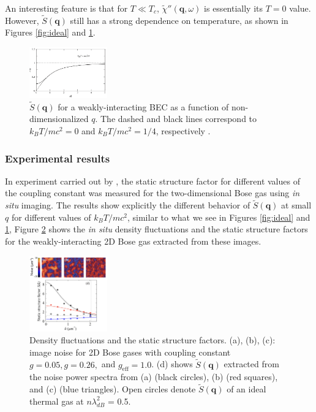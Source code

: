 \documentclass[reprint,
nofootinbib,
amsmath,amssymb,
aps]{revtex4-1}
\begin{document}
An interesting feature is that for $T \ll T_c$, $\widetilde{\chi}''(\mathbf{q},\omega)$ is essentially its $T=0$ value. However, $\widetilde{S}(\mathbf{q})$ still has a strong dependence on temperature, as shown in Figures \ref{fig:ideal} and \ref{fig:interacting}. 

\begin{figure}[!htb]
\label{fig:interacting}
\centering
\includegraphics[width=0.3\textwidth]{figures/interacting.png}
\caption{$\widetilde{S}(\mathbf{q})$ for a weakly-interacting BEC as a function of non-dimensionalized $q$. The dashed and black lines correspond to $k_BT/mc^2=0$ and $k_BT/mc^2 = 1/4$, respectively \cite{pitaevskii2016bose}.}
\end{figure}
\subsubsection{Experimental results}

In experiment carried out by \cite{hung2011extracting}, the static structure factor for different values of the coupling constant was measured for the two-dimensional Bose gas using \textit{in situ} imaging. The results show explicitly the different behavior of $\widetilde{S}(\mathbf{q})$ at small $q$ for different values of $k_BT / mc^2$, similar to what we see in Figures \ref{fig:ideal} and \ref{fig:interacting}, Figure \ref{fig:hung2011} shows the \textit{in situ} density fluctuations and the static structure factors for the weakly-interacting 2D Bose gas extracted from these images. 
\begin{figure}[!htb]
\label{fig:hung2011}
\centering
\includegraphics[width=0.3\textwidth]{figures/hung2011.png}
\caption{Density fluctuations and the static structure factors. (a), (b), (c): image noise for 2D Bose gases with coupling constant $g = 0.05, g = 0.26,$ and $g_\text{eff} = 1.0$. (d) shows $\widetilde{S}(\mathbf{q})$ extracted from the noise power spectra from (a) (black circles), (b) (red squares), and (c) (blue triangles). Open circles denote $\widetilde{S}(\mathbf{q})$ of an ideal thermal gas at $n\lambda_{dB}^2$ = 0.5. }
\end{figure}
\end{document}
